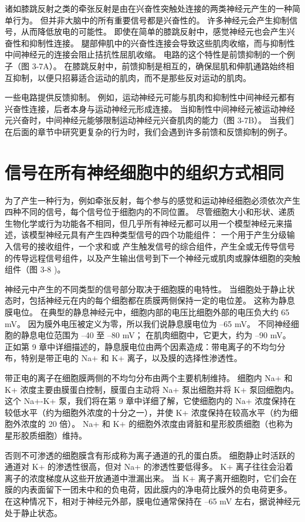 诸如膝跳反射之类的牵张反射是由在兴奋性突触处连接的两类神经元产生的一种简单行为。 
但并非大脑中的所有重要信号都是兴奋性的。 
许多神经元会产生抑制信号，从而降低放电的可能性。 
即使在简单的膝跳反射中，感觉神经元也会产生兴奋性和抑制性连接。 
腿部伸肌中的兴奋性连接会导致这些肌肉收缩，而与抑制性中间神经元的连接会阻止拮抗性屈肌收缩。 
电路的这个特性是前馈抑制的一个例子（图 3-7A）。 
在膝跳反射中，前馈抑制是相互的，确保屈肌和伸肌通路始终相互抑制，以便只招募适合运动的肌肉，而不是那些反对运动的肌肉。


一些电路提供反馈抑制。 
例如，运动神经元可能与肌肉和抑制性中间神经元都有兴奋性连接，后者本身与运动神经元形成连接。 
当抑制性中间神经元被运动神经元兴奋时，中间神经元能够限制运动神经元兴奋肌肉的能力（图 3-7B）。 
当我们在后面的章节中研究更复杂的行为时，我们会遇到许多前馈和反馈抑制的例子。


\section{信号在所有神经细胞中的组织方式相同}
为了产生一种行为，例如牵张反射，每个参与的感觉和运动神经细胞必须依次产生四种不同的信号，每个信号位于细胞内的不同位置。 
尽管细胞大小和形状、递质生物化学或行为功能各不相同，但几乎所有神经元都可以用一个模型神经元来描述，该模型神经元具有产生四种类型信号的四个功能组件：
一个用于产生分级输入信号的接收组件，一个求和或 产生触发信号的综合组件，产生全或无传导信号的传导远程信号组件，以及产生输出信号到下一个神经元或肌肉或腺体细胞的突触组件（图 3-8 )。


神经元中产生的不同类型的信号部分取决于细胞膜的电特性。 
当细胞处于静止状态时，包括神经元在内的每个细胞都在质膜两侧保持一定的电位差。 
这称为静息膜电位。 
在典型的静息神经元中，细胞内部的电压比细胞外部的电压负大约 65 mV。 
因为膜外电压被定义为零，所以我们说静息膜电位为 –65 mV。 
不同神经细胞的静息电位范围为 –40 至 –80 mV； 
在肌肉细胞中，它更大，约为 –90 mV。 
正如第 9 章中详细描述的，静息膜电位由两个因素造成：带电离子的不均匀分布，特别是带正电的 Na+ 和 K+ 离子，以及膜的选择性渗透性。


带正电的离子在细胞膜两侧的不均匀分布由两个主要机制维持。 
细胞内 Na+ 和 K+ 浓度主要由膜蛋白控制，膜蛋白主动将 Na+ 泵出细胞并将 K+ 泵回细胞内。 
这个 Na+-K+ 泵，我们将在第 9 章中详细了解，它使细胞内的 Na+ 浓度保持在较低水平（约为细胞外浓度的十分之一），并使 K+ 浓度保持在较高水平（约为细胞外浓度的 20 倍）。 
Na+ 和 K+ 的细胞外浓度由肾脏和星形胶质细胞（也称为星形胶质细胞）维持。


否则不可渗透的细胞膜含有形成称为离子通道的孔的蛋白质。 细胞静止时活跃的通道对 K+ 的渗透性很高，但对 Na+ 的渗透性要低得多。 
K+ 离子往往会沿着离子的浓度梯度从这些开放通道中泄漏出来。 
当 K+ 离子离开细胞时，它们会在膜的内表面留下一团未中和的负电荷，因此膜内的净电荷比膜外的负电荷更多。 
在这种情况下，相对于神经元外部，膜电位通常保持在 –65 mV 左右，据说神经元处于静止状态。


